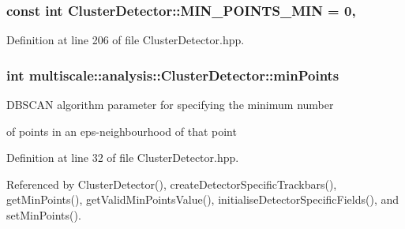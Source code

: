 \hypertarget{classmultiscale_1_1analysis_1_1ClusterDetector_aa0219df3977a845e46be090e6c3f90ad}{
\subsubsection[{M\-I\-N\-\_\-\-P\-O\-I\-N\-T\-S\-\_\-\-M\-I\-N}]{\setlength{\rightskip}{0pt plus 5cm}const int Cluster\-Detector\-::\-M\-I\-N\-\_\-\-P\-O\-I\-N\-T\-S\-\_\-\-M\-I\-N = 0\hspace{0.3cm}{\ttfamily [static]}, {\ttfamily [private]}}}\label{classmultiscale_1_1analysis_1_1ClusterDetector_aa0219df3977a845e46be090e6c3f90ad}


Definition at line 206 of file Cluster\-Detector.\-hpp.

\hypertarget{classmultiscale_1_1analysis_1_1ClusterDetector_aa94df1adc462be5931ec25ba24122fe9}{
\subsubsection[{min\-Points}]{\setlength{\rightskip}{0pt plus 5cm}int multiscale\-::analysis\-::\-Cluster\-Detector\-::min\-Points\hspace{0.3cm}{\ttfamily [protected]}}}\label{classmultiscale_1_1analysis_1_1ClusterDetector_aa94df1adc462be5931ec25ba24122fe9}
\begin{DoxyVerb}                  DBSCAN algorithm parameter for specifying the minimum number
\end{DoxyVerb}
 of points in an eps-\/neighbourhood of that point 

Definition at line 32 of file Cluster\-Detector.\-hpp.



Referenced by Cluster\-Detector(), create\-Detector\-Specific\-Trackbars(), get\-Min\-Points(), get\-Valid\-Min\-Points\-Value(), initialise\-Detector\-Specific\-Fields(), and set\-Min\-Points().

